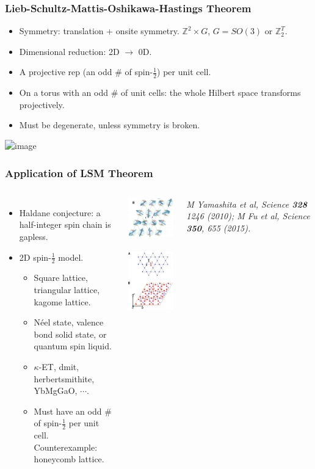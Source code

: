 \documentclass[xcolor=table, 10pt, aspectratio=43]{beamer}
\begin{document}
\begin{frame}
\frametitle{Lieb-Schultz-Mattis-Oshikawa-Hastings Theorem}
\begin{itemize}
\item Symmetry: translation + onsite symmetry. $\mathbb Z^2\times G$, $G = SO(3) \text{ or } \mathbb Z_2^T$.
\item Dimensional reduction: 2D $\rightarrow$ 0D.
\item A projective rep (an odd \# of spin-$\frac12$) per unit cell.
\item On a torus with an odd \# of unit cells: the whole Hilbert space transforms projectively.
\item Must be degenerate, unless symmetry is broken.
\end{itemize}
\begin{center}
  \includegraphics<1>{../dimer/dimer_spin}
\end{center}
\end{frame}

\begin{frame}
\frametitle{Application of LSM Theorem}
\begin{columns}
\begin{itemize}
\item Haldane conjecture: a half-integer spin chain is gapless.
\item 2D spin-$\frac12$ model.
\begin{itemize}
  \item Square lattice, triangular lattice, kagome lattice.
  \item N\'eel state, valence bond solid state, or quantum spin liquid.
  \item $\kappa$-ET, dmit, herbertsmithite, YbMgGaO, $\cdots$.
  \item Must have an odd \# of spin-$\frac12$ per unit cell.\\
  Counterexample: honeycomb lattice.
\end{itemize}\end{itemize}
\begin{center}
  \includegraphics[width=2cm]{../spinexp/dmit}~~~~
  \includegraphics[width=2cm]{../spinexp/herbertsmithite}
\end{center}
\emph{M Yamashita et al, Science \textbf{328} 1246 (2010); \small M Fu et al, Science \textbf{350}, 655 (2015).}
\end{columns}
\end{frame}
\end{document}
